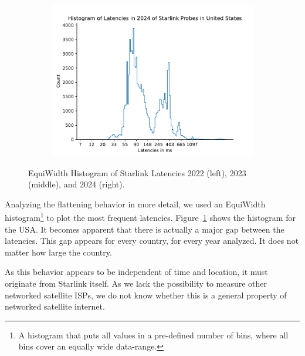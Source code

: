 \begin{figure}
\begin{subfigure}[b]{0.3\linewidth}
		\includegraphics[width=\linewidth]{chapters/4-results/latency/img/histogram_of_latencies_in_2024_of_starlink_probes_in_united_states.pdf}
	\end{subfigure}
	\caption{EquiWidth Histogram of Starlink Latencies 2022 (left), 2023 (middle), and 2024 (right).}
	\label{fig:latency-histogram-usa}
\end{figure}

Analyzing the flattening behavior in more detail, we used an EquiWidth histogram\footnote{A histogram that puts all values in a pre-defined number of bins, where all bins cover an equally wide data-range.} to plot the most frequent latencies. Figure~\ref{fig:latency-histogram-usa} shows the histogram for the USA. It becomes apparent that there is actually a major gap between the latencies.
This gap appears for every country, for every year analyzed. It does not matter how large the country.

As this behavior appears to be independent of time and location, it must originate from Starlink itself. As we lack the possibility to measure other networked satellite ISPs, we do not know whether this is a general property of networked satellite internet.

